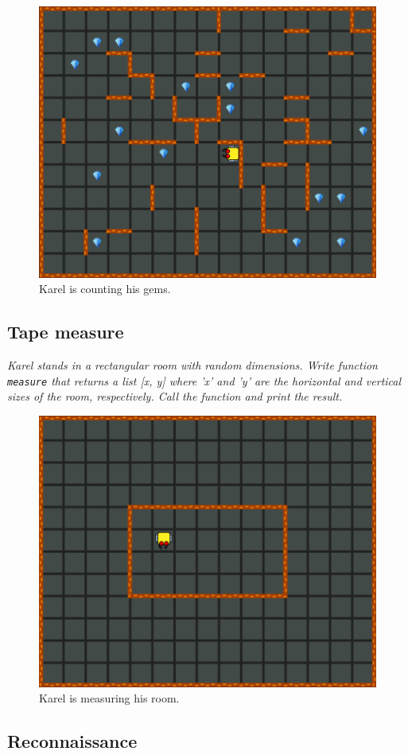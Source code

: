 {{\begin{figure}[!ht]
\begin{center}
\includegraphics[height=0.4\textwidth]{img/h01.png}
\end{center}
\vspace{-4mm}
\caption{Karel is counting his gems.}
\label{fig:h01}
\end{figure}



\subsection{Tape measure}

{\em Karel stands in a rectangular room with random dimensions. Write function {\tt measure}  
that returns a list [x, y] where 'x' and 'y' are the horizontal and vertical sizes of the room,
respectively. Call the function and print the result.}

\begin{figure}[!ht]
\begin{center}
\includegraphics[height=0.4\textwidth]{img/h02.png}
\end{center}
\vspace{-4mm}
\caption{Karel is measuring his room.}
\label{fig:h02}
\end{figure}



\subsection{Reconnaissance}

}}
